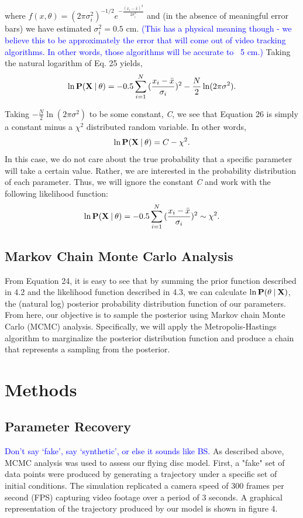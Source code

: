 \documentclass[a4paper,12pt, oneside]{article}
\newcommand{\blue}[1]{\textcolor{blue}{#1}}
\newcommand\givenbase[1][]{\:#1\lvert\:}
\let\given\givenbase
\begin{document}
where $f(x,\theta)=(2\pi\sigma_{i}^2)^{-1/2}e^{-\frac{(x_{i}-\bar{x})^2}{2\sigma_i^2}}$ and (in the absence of meaningful error bars) we have estimated $\sigma_i^2=0.5$ cm. \blue{(This has a physical meaning though - we believe this to be approximately the error that will come out of video tracking algorithms. In other words, those algorithms will be accurate to ~5 cm.)} Taking the natural logarithm of Eq. 25 yields,
\begin{equation}
\ln\bold{P({X}\given\theta)}={-0.5 \sum_{i=1}^{N} {(\frac { x_i-\bar{x} } {\sigma_{i}}})^2} - \frac{N}{2}\ln(2\pi\sigma^2).
\end{equation}

Taking $-\frac{N}{2}\ln(2\pi\sigma^2)$ to be some constant, \textit{C}, we see that Equation 26 is simply a constant minus a $\chi^2$ distributed random variable. In other words, 
\begin{equation*}
\ln\bold{P({X}\given\theta)}=C-\chi^2.
\end{equation*}
In this case, we do not care about the true probability that a specific parameter will take a certain value. Rather, we are interested in the probability distribution of each parameter. Thus, we will ignore the constant \textit{C} and work with the following likelihood function:
\begin{equation}
\ln\bold{P({X}\given\theta)}={-0.5 \sum_{i=1}^{N} {(\frac { x_i-\bar{x} } {\sigma_{i}}})^2} \sim \chi^2.
\end{equation}
\subsection{Markov Chain Monte Carlo Analysis}
From Equation 24, it is easy to see that by summing the prior function described in 4.2 and the likelihood function described in 4.3, we can calculate $\ln\bold{P}(\theta\given\bold{X})$, the (natural log) posterior probability distribution function of our parameters. From here, our objective is to sample the posterior using Markov chain Monte Carlo (MCMC) analysis. Specifically, we will apply the Metropolis-Hastings algorithm to marginalize the posterior distribution function and produce a chain that represents a sampling from the posterior.

\section{Methods}
\subsection{Parameter Recovery}
\blue{Don't say `fake', say `synthetic', or else it sounds like BS.}
As described above, MCMC analysis was used to assess our flying disc model. First, a "fake" set of data points were produced by generating a trajectory under a specific set of initial conditions. The simulation replicated a camera speed of 300 frames per second (FPS) capturing video footage over a period of 3 seconds. A graphical representation of the trajectory produced by our model is shown in figure 4. 
\end{document}
